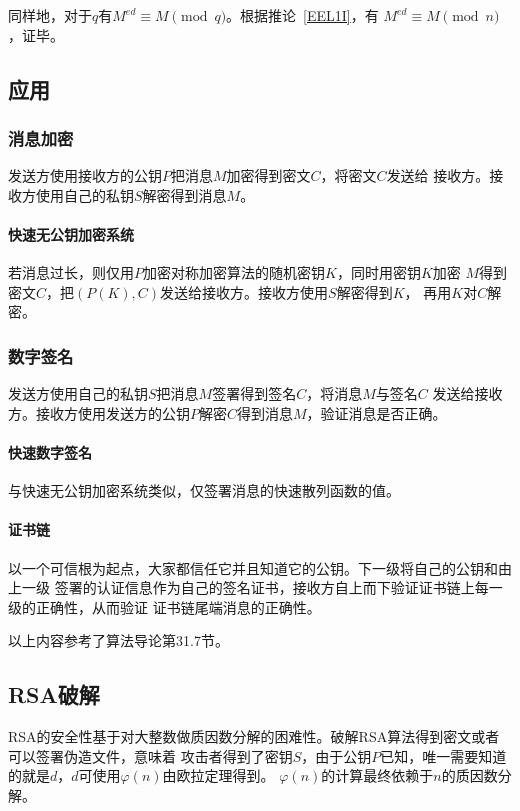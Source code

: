 同样地，对于$q$有$M^{ed}\equiv M \pmod{q}$。根据推论~\ref{EEL1I}，有
$M^{ed}\equiv M \pmod{n}$，证毕。

\subsection{应用}
\subsubsection{消息加密}
发送方使用接收方的公钥$P$把消息$M$加密得到密文$C$，将密文$C$发送给
接收方。接收方使用自己的私钥$S$解密得到消息$M$。
\paragraph{快速无公钥加密系统}
若消息过长，则仅用$P$加密对称加密算法的随机密钥$K$，同时用密钥$K$加密
$M$得到密文$C$，把$(P(K),C)$发送给接收方。接收方使用$S$解密得到$K$，
再用$K$对$C$解密。
\subsubsection{数字签名}
发送方使用自己的私钥$S$把消息$M$签署得到签名$C$，将消息$M$与签名$C$
发送给接收方。接收方使用发送方的公钥$P$解密$C$得到消息$M$，验证消息是否正确。
\paragraph{快速数字签名}
与快速无公钥加密系统类似，仅签署消息的快速散列函数的值。
\paragraph{证书链}
以一个可信根为起点，大家都信任它并且知道它的公钥。下一级将自己的公钥和由上一级
签署的认证信息作为自己的签名证书，接收方自上而下验证证书链上每一级的正确性，从而验证
证书链尾端消息的正确性。

以上内容参考了算法导论\cite{ITA3}第31.7节。
\subsection{RSA破解}
RSA的安全性基于对大整数做质因数分解的困难性。破解RSA算法得到密文或者可以签署伪造文件，意味着
攻击者得到了密钥$S$，由于公钥$P$已知，唯一需要知道的就是$d$，$d$可使用$\varphi(n)$由欧拉定理得到。
$\varphi(n)$的计算最终依赖于$n$的质因数分解。
